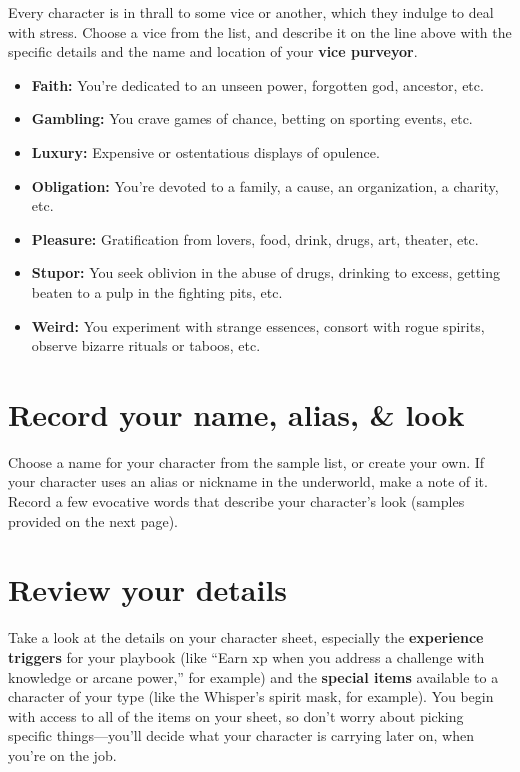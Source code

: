 \documentclass[11pt,oneside]{book}
\newcommand{\gameterm}[1]{\textbf{#1}}
\begin{document}
Every character is in thrall to some vice or another, which they indulge to deal with stress. Choose a vice from the list, and describe it on the line above with the specific details and the name and location of your \textbf{vice purveyor}.

\begin{itemize}
	\item \gameterm{Faith: } You’re dedicated to an unseen power, forgotten god, ancestor, etc.
	\item \gameterm{Gambling:}  You crave games of chance, betting on sporting events, etc.
	\item \gameterm{Luxury: } Expensive or ostentatious displays of opulence.
	\item \gameterm{Obligation: } You’re devoted to a family, a cause, an organization, a charity, etc.
	\item \gameterm{Pleasure:}  Gratification from lovers, food, drink, drugs, art, theater, etc.
	\item \gameterm{Stupor: } You seek oblivion in the abuse of drugs, drinking to excess, getting beaten to a pulp in the fighting pits, etc.
	\item \gameterm{Weird: } You experiment with strange essences, consort with rogue spirits, observe bizarre rituals or taboos, etc.
\end{itemize}

\section{Record your name, alias, \& look}

Choose a name for your character from the sample list, or create your own. If your character uses an alias or nickname in the underworld, make a note of it. Record a few evocative words that describe your character’s look (samples provided on the next page).

\section{Review your details}

Take a look at the details on your character sheet, especially the \textbf{experience triggers} for your playbook (like “Earn xp when you address a challenge with knowledge or arcane power,” for example) and the \textbf{special items} available to a character of your type (like the Whisper’s spirit mask, for example). You begin with access to all of the items on your sheet, so don’t worry about picking specific things---you’ll decide what your character is carrying later on, when you’re on the job.
\end{document}
